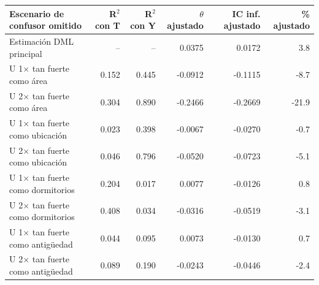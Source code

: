 \begin{tabular}{lrrrrr}
\toprule
Escenario de confusor omitido & R$^2$ con T & R$^2$ con Y & $\theta$ ajustado & IC inf. ajustado & \% ajustado \\
\midrule
Estimación DML principal & -- & -- & 0.0375 & 0.0172 & 3.8 \\
U 1$\times$ tan fuerte como área & 0.152 & 0.445 & -0.0912 & -0.1115 & -8.7 \\
U 2$\times$ tan fuerte como área & 0.304 & 0.890 & -0.2466 & -0.2669 & -21.9 \\
U 1$\times$ tan fuerte como ubicación & 0.023 & 0.398 & -0.0067 & -0.0270 & -0.7 \\
U 2$\times$ tan fuerte como ubicación & 0.046 & 0.796 & -0.0520 & -0.0723 & -5.1 \\
U 1$\times$ tan fuerte como dormitorios & 0.204 & 0.017 & 0.0077 & -0.0126 & 0.8 \\
U 2$\times$ tan fuerte como dormitorios & 0.408 & 0.034 & -0.0316 & -0.0519 & -3.1 \\
U 1$\times$ tan fuerte como antigüedad & 0.044 & 0.095 & 0.0073 & -0.0130 & 0.7 \\
U 2$\times$ tan fuerte como antigüedad & 0.089 & 0.190 & -0.0243 & -0.0446 & -2.4 \\
\bottomrule
\end{tabular}